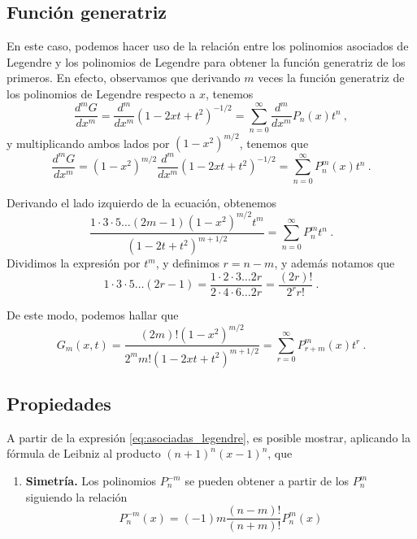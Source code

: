 \subsection{Función generatriz}

En este caso, podemos hacer uso de la relación entre los polinomios asociados de Legendre y los polinomios de Legendre para obtener la función generatriz de los primeros. En efecto, observamos que derivando $m$ veces la función generatriz de los polinomios de Legendre respecto a $x$, tenemos
\begin{equation}
    \frac{d^m G}{dx^m} = \frac{d^m}{dx^m}(1-2xt+t^2)^{-1/2} = \sum_{n=0}^\infty \frac{d^m}{dx^m}P_n(x) t^n \ ,
\end{equation}
y multiplicando ambos lados por $(1-x^2)^{m/2}$, tenemos que
\begin{equation}
    \frac{d^m G}{dx^m} = (1-x^2)^{m/2} \frac{d^m}{dx^m}(1-2xt+t^2)^{-1/2} = \sum_{n=0}^\infty P^m_n(x) t^n \ .
\end{equation}

Derivando el lado izquierdo de la ecuación, obtenemos
\begin{equation}
    \frac{1 \cdot 3 \cdot 5 \dots (2m-1) (1-x^2)^{m/2} t^m}{(1-2t+t^2)^{m+1/2}} = \sum_{n=0}^\infty P_n^m t^n \ .
\end{equation}
Dividimos la expresión por $t^m$, y definimos $r=n-m$, y además notamos que
\begin{equation}
    1 \cdot 3 \cdot 5 \dots (2r-1) = \frac{1 \cdot 2 \cdot 3 \dots 2r}{2 \cdot 4 \cdot 6 \dots 2r} = \frac{(2r)!}{2^r r!} \ .
\end{equation}

De este modo, podemos hallar que
\begin{equation}
    G_m(x,t) = \frac{(2m)! (1-x^2)^{m/2}}{2^m m! (1-2xt+t^2)^{m+1/2}} = \sum_{r=0}^\infty P_{r+m}^m(x) t^r \ .
\end{equation}

\subsection{Propiedades}

A partir de la expresión \eqref{eq:asociadas_legendre}, es posible mostrar, aplicando la fórmula de Leibniz al producto $(n+1)^n (x-1)^n$, que
\begin{enumerate}[series=asociadas]
    \item \textbf{Simetría.} Los polinomios $P^{-m}_n$ se pueden obtener a partir de los $P^{m}_n$ siguiendo la relación
    \begin{equation}
        P^{-m}_n(x) = (-1)m \frac{(n-m)!}{(n+m)!}P^{m}_n(x)
    \end{equation}
\end{enumerate}

